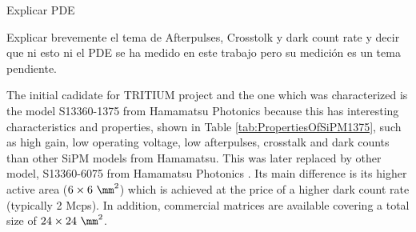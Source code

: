 Explicar PDE

Explicar brevemente el tema de Afterpulses, Crosstolk y dark count rate y decir que ni esto ni el PDE se ha medido en este trabajo pero su medición es un tema pendiente.

The initial cadidate for TRITIUM project and the one which was characterized is the model S13360-1375 from Hamamatsu Photonics \cite{DataSheetHammamatsu_1_SiPM_1375} because this has interesting characteristics and properties, shown in Table \ref{tab:PropertiesOfSiPM1375}, such as high gain, low operating voltage, low afterpulses, crosstalk and dark counts than other SiPM models from Hamamatsu. This was later replaced by other model, S13360-6075 from Hamamatsu Photonics \cite{DataSheetHammamatsu_1_SiPM_75}. Its main difference is its higher active area ($6\times6~\mm^2$) which is achieved at the price of a higher dark count rate (typically 2 Mcps). In addition, commercial matrices are available covering a total size of $24\times24~\mm^2$.


